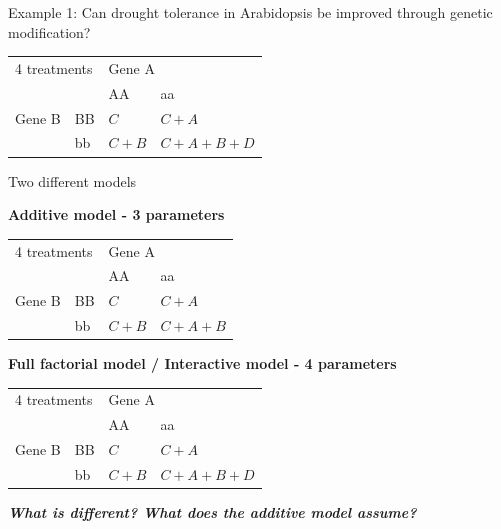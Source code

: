 \documentclass{beamer}
\begin{document}
\begin{frame}{Example 1: Can drought tolerance in Arabidopsis be improved through genetic modification?}
\pause

\begin{center}
\begin{tabular}{|l | l | l | l | }
\toprule
  \multicolumn{2}{|l|}{4 treatments} & \multicolumn{2}{l|}{Gene A}\\
  \cmidrule(lr){3-4}
  \multicolumn{2}{|l|}{}  & AA & aa\\
 	    \midrule
      Gene B & BB & $C$ & $C+A$\\
      \cmidrule(lr){3-4}
 	    & bb & $C+B$ & $C+A+B+D$\\
	    \bottomrule
  \end{tabular}
\end{center}
 
\end{frame}

\begin{frame}{Two different models}

\textbf{Additive model - 3 parameters}
\begin{center}
\begin{tabular}{|l | l | l | l | }
\toprule
  \multicolumn{2}{|l|}{4 treatments} & \multicolumn{2}{l|}{Gene A}\\
  \cmidrule(lr){3-4}
  \multicolumn{2}{|l|}{}  & AA & aa\\
 	    \midrule
      Gene B & BB & $C$ & $C+A$\\
      \cmidrule(lr){3-4}
 	    & bb & $C+B$ & $C+A+B$\\
	    \bottomrule
  \end{tabular}
\end{center}
 

\textbf{Full factorial model / Interactive model  - 4 parameters }
\begin{center}
\begin{tabular}{|l | l | l | l | }
\toprule
  \multicolumn{2}{|l|}{4 treatments} & \multicolumn{2}{l|}{Gene A}\\
  \cmidrule(lr){3-4}
  \multicolumn{2}{|l|}{}  & AA & aa\\
 	    \midrule
      Gene B & BB & $C$ & $C+A$\\
      \cmidrule(lr){3-4}
 	    & bb & $C+B$ & $C+A+B+D$\\
	    \bottomrule
  \end{tabular}
\end{center}
 

 \textbf{\emph{What is different? What does the additive model assume?}}
\end{frame}
\end{document}

